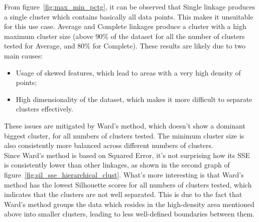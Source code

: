 From figure~\ref{fig:max_min_pctg}, it can be observed that Single linkage produces a single cluster which contains basically all data points. This makes it unsuitable for this use case.
Average and Complete linkages produce a cluster with a high maximum cluster size (above 90\% of the dataset for all the number of clusters tested for Average, and 80\% for Complete).
These results are likely due to two main causes: 
\begin{itemize}
    \item Usage of skewed features, which lead to areas with a very high density of points;
    \item High dimensionality of the dataset, which makes it more difficult to separate clusters effectively.
\end{itemize}

These issues are mitigated by Ward's method, which doesn't show a dominant biggest cluster, for
all numbers of clusters tested. The minimum cluster size is also consistently more balanced
across different numbers of clusters.\\


Since Ward's method is based on Squared Error, it's not surprising how its SSE is consistently lower than other linkages, as shown in the second graph of figure~\ref{fig:sil_sse_hierarchical_clust}.
What's more interesting is that Ward's method has the lowest Silhouette scores for all numbers
of clusters tested, which indicates that the clusters are not well separated. This is due to
the fact that Ward's method groups the data which resides in the high-density area
mentioned above into smaller clusters, leading to less well-defined boundaries between them.

